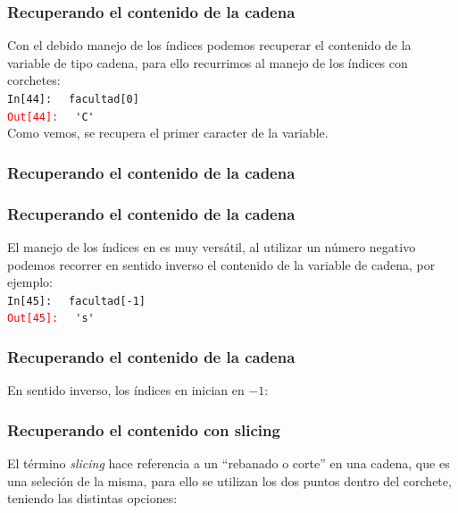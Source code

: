 {\begin{frame}
\end{frame}
\begin{frame}[fragile]
\frametitle{Recuperando el contenido de la cadena}
Con el debido manejo de los índices podemos recuperar el contenido de la variable de tipo cadena, para ello recurrimos al manejo de los índices con corchetes:
\\
\bigskip
\pause
\textcolor{ao}{\texttt{In[44]: }} \verb| facultad[0]|
\\
\pause
\textcolor{red}{\texttt{Out[44]: }} \verb| 'C'|
\\
\medskip
Como vemos, se recupera el primer caracter de la variable.
\end{frame}
\begin{frame}[fragile]
\frametitle{Recuperando el contenido de la cadena}
\begin{figure}
	 
\end{figure}
\end{frame}
\begin{frame}[fragile]
\frametitle{Recuperando el contenido de la cadena}
El manejo de los índices en \python{} es muy versátil, al utilizar un número negativo podemos recorrer en sentido inverso el contenido de la variable de cadena, por ejemplo:
\\
\bigskip
\pause
\textcolor{ao}{\texttt{In[45]: }} \verb| facultad[-1]|
\\
\pause
\textcolor{red}{\texttt{Out[45]: }} \verb| 's'|
\end{frame}
\begin{frame}[fragile]
\frametitle{Recuperando el contenido de la cadena}
En sentido inverso, los índices en \python{} inician en $-1$:
\begin{figure}
		
\end{figure}
\end{frame}
\begin{frame}[fragile]
\frametitle{Recuperando el contenido con slicing}
El término \emph{slicing} hace referencia a un \enquote{rebanado o corte} en una cadena, que es una seleción de la misma, para ello se utilizan los dos puntos dentro del corchete, teniendo las distintas opciones:
\end{frame}
\begin{frame}[fragile]

\end{frame}}
